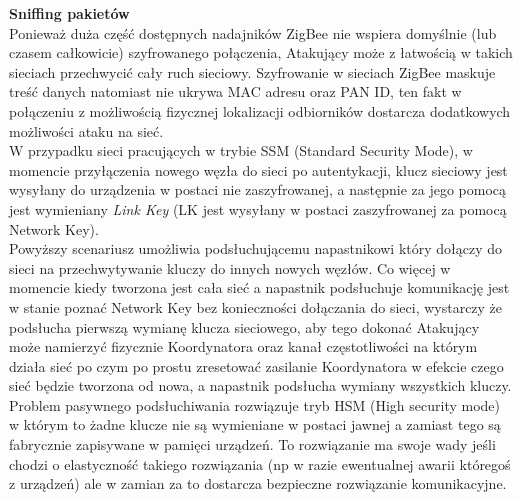 \par
\tab \textbf{Sniffing pakietów} \\
Ponieważ duża część dostępnych nadajników ZigBee nie wspiera domyślnie (lub czasem całkowicie) szyfrowanego połączenia, Atakujący może z łatwością w takich sieciach przechwycić cały ruch sieciowy. Szyfrowanie w sieciach ZigBee maskuje treść danych natomiast nie ukrywa MAC adresu oraz PAN ID, ten fakt w połączeniu z możliwością fizycznej lokalizacji odbiorników dostarcza dodatkowych możliwości ataku na sieć.\\
W przypadku sieci pracujących w trybie SSM (Standard Security Mode), w momencie przyłączenia nowego węzła do sieci po autentykacji, klucz sieciowy jest wysyłany do urządzenia w postaci nie zaszyfrowanej, a następnie za jego pomocą jest wymieniany \textit{Link Key} (LK jest wysyłany w postaci zaszyfrowanej za pomocą Network Key).\\ 
Powyższy scenariusz umożliwia podsłuchującemu napastnikowi który dołączy do sieci na przechwytywanie kluczy do innych nowych węzłów. Co więcej w momencie kiedy tworzona jest cała sieć a napastnik podsłuchuje komunikację jest w stanie poznać Network Key bez konieczności dołączania do sieci, wystarczy że podsłucha pierwszą wymianę klucza sieciowego, aby tego dokonać Atakujący może namierzyć fizycznie Koordynatora oraz kanał częstotliwości na którym działa sieć po czym po prostu zresetować zasilanie Koordynatora w efekcie czego sieć będzie tworzona od nowa, a napastnik podsłucha wymiany wszystkich kluczy. \\
Problem pasywnego podsłuchiwania rozwiązuje tryb HSM (High security mode) w którym to żadne klucze nie są wymieniane w postaci jawnej a zamiast tego są fabrycznie zapisywane w pamięci urządzeń. To rozwiązanie ma swoje wady jeśli chodzi o elastyczność takiego rozwiązania (np w razie ewentualnej awarii któregoś z urządzeń) ale w zamian za to dostarcza bezpieczne rozwiązanie komunikacyjne. \\

